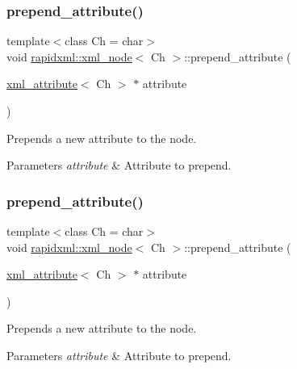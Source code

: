 \subsubsection{\texorpdfstring{prepend\+\_\+attribute()}{prepend\_attribute()}\hspace{0.1cm}{\footnotesize\ttfamily [1/2]}}
{\footnotesize\ttfamily template$<$class Ch = char$>$ \\
void \mbox{\hyperlink{classrapidxml_1_1xml__node}{rapidxml\+::xml\+\_\+node}}$<$ Ch $>$\+::prepend\+\_\+attribute (\begin{DoxyParamCaption}\item[{\mbox{\hyperlink{classrapidxml_1_1xml__attribute}{xml\+\_\+attribute}}$<$ Ch $>$ $\ast$}]{attribute }\end{DoxyParamCaption})\hspace{0.3cm}{\ttfamily [inline]}}

Prepends a new attribute to the node. 
\begin{DoxyParams}{Parameters}
{\em attribute} & Attribute to prepend. \\
\hline
\end{DoxyParams}
\mbox{\label{classrapidxml_1_1xml__node_a8b62ee76489faf8e2d1210869d547684}} 
\subsubsection{\texorpdfstring{prepend\+\_\+attribute()}{prepend\_attribute()}\hspace{0.1cm}{\footnotesize\ttfamily [2/2]}}
{\footnotesize\ttfamily template$<$class Ch = char$>$ \\
void \mbox{\hyperlink{classrapidxml_1_1xml__node}{rapidxml\+::xml\+\_\+node}}$<$ Ch $>$\+::prepend\+\_\+attribute (\begin{DoxyParamCaption}\item[{\mbox{\hyperlink{classrapidxml_1_1xml__attribute}{xml\+\_\+attribute}}$<$ Ch $>$ $\ast$}]{attribute }\end{DoxyParamCaption})\hspace{0.3cm}{\ttfamily [inline]}}

Prepends a new attribute to the node. 
\begin{DoxyParams}{Parameters}
{\em attribute} & Attribute to prepend. \\
\hline
\end{DoxyParams}
\mbox{\label{classrapidxml_1_1xml__node_ae86e92908c3eab40bbed8216e4f3f3cb}} 
